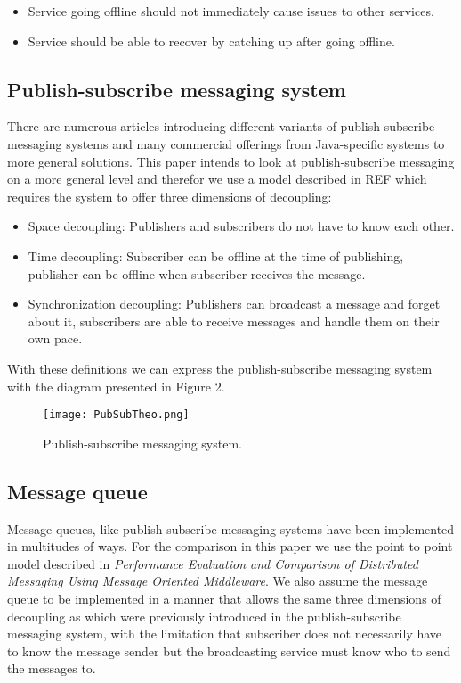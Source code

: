 \documentclass[conference]{IEEEtran}
\begin{document}
\begin{itemize}
    \item Service going offline should not immediately cause issues to other services.
    \item Service should be able to recover by catching up after going offline.
\end{itemize}

\subsection{Publish-subscribe messaging system}
There are numerous articles introducing different variants of publish-subscribe messaging systems and many commercial offerings from Java-specific systems to more general solutions. This paper intends to look at publish-subscribe messaging on a more general level and therefor we use a model described in REF which requires the system to offer three dimensions of decoupling:


\begin{itemize}
    \item Space decoupling: Publishers and subscribers do not have to know each other.
    \item Time decoupling: Subscriber can be offline at the time of publishing, publisher can be offline when subscriber receives the message.
    \item Synchronization decoupling: Publishers can broadcast a message and forget about it, subscribers are able to receive messages and handle them on their own pace.
\end{itemize}
With these definitions we can express the publish-subscribe messaging system with the diagram presented in Figure 2.
\begin{figure}
    \centering
    \texttt{[image: PubSubTheo.png]}
    \caption{Publish-subscribe messaging system.}
\end{figure}


\subsection{Message queue}
Message queues, like publish-subscribe messaging systems have been implemented in multitudes of ways. For the comparison in this paper we use the point to point model described in \textit{Performance Evaluation and Comparison of Distributed Messaging Using Message Oriented Middleware}. We also assume the message queue to be implemented in a manner that allows the same three dimensions of decoupling as which were previously introduced in the publish-subscribe messaging system, with the limitation that subscriber does not necessarily have to know the message sender but the broadcasting service must know who to send the messages to.
\end{document}
